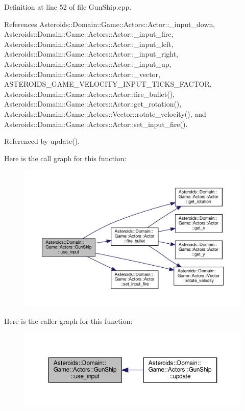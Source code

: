 Definition at line 52 of file Gun\+Ship.\+cpp.



References Asteroids\+::\+Domain\+::\+Game\+::\+Actors\+::\+Actor\+::\+\_\+input\+\_\+down, Asteroids\+::\+Domain\+::\+Game\+::\+Actors\+::\+Actor\+::\+\_\+input\+\_\+fire, Asteroids\+::\+Domain\+::\+Game\+::\+Actors\+::\+Actor\+::\+\_\+input\+\_\+left, Asteroids\+::\+Domain\+::\+Game\+::\+Actors\+::\+Actor\+::\+\_\+input\+\_\+right, Asteroids\+::\+Domain\+::\+Game\+::\+Actors\+::\+Actor\+::\+\_\+input\+\_\+up, Asteroids\+::\+Domain\+::\+Game\+::\+Actors\+::\+Actor\+::\+\_\+vector, A\+S\+T\+E\+R\+O\+I\+D\+S\+\_\+\+G\+A\+M\+E\+\_\+\+V\+E\+L\+O\+C\+I\+T\+Y\+\_\+\+I\+N\+P\+U\+T\+\_\+\+T\+I\+C\+K\+S\+\_\+\+F\+A\+C\+T\+OR, Asteroids\+::\+Domain\+::\+Game\+::\+Actors\+::\+Actor\+::fire\+\_\+bullet(), Asteroids\+::\+Domain\+::\+Game\+::\+Actors\+::\+Actor\+::get\+\_\+rotation(), Asteroids\+::\+Domain\+::\+Game\+::\+Actors\+::\+Vector\+::rotate\+\_\+velocity(), and Asteroids\+::\+Domain\+::\+Game\+::\+Actors\+::\+Actor\+::set\+\_\+input\+\_\+fire().



Referenced by update().

Here is the call graph for this function\+:\nopagebreak
\begin{figure}[H]
\begin{center}
\leavevmode
\includegraphics[width=350pt]{classAsteroids_1_1Domain_1_1Game_1_1Actors_1_1GunShip_aae99fa7e1cae7f17c81b68217ed2fa32_cgraph}
\end{center}
\end{figure}
Here is the caller graph for this function\+:\nopagebreak
\begin{figure}[H]
\begin{center}
\leavevmode
\includegraphics[width=350pt]{classAsteroids_1_1Domain_1_1Game_1_1Actors_1_1GunShip_aae99fa7e1cae7f17c81b68217ed2fa32_icgraph}
\end{center}
\end{figure}


